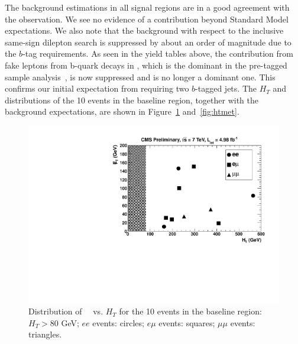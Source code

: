 \clearpage

The background estimations in all signal regions
are in a good agreement with the observation.  We see no evidence of 
a contribution beyond Standard Model expectations.
We also note that the background with respect to the inclusive same-sign
dilepton search is suppressed by about
an order of magnitude due to the $b$-tag requirements.
As seen in the yield tables above, the 
contribution from fake leptons from b-quark decays in \ttbar,
which is the dominant in the pre-tagged sample analysis~\cite{ssnote2011},
is now suppressed and is no longer a dominant one.
This confirms our initial expectation from requiring two $b$-tagged jets.
The $H_T$ and \met~ distributions of the 10 events 
in the baseline region,
together with the background expectations, are shown in 
Figure~\ref{fig:htvsmet} and~\ref{fig:htmet}.

\begin{figure}[h]
\begin{center}
\includegraphics[width=0.48\linewidth]{figs/MetVsHt.pdf}
\caption{\label{fig:htvsmet}
Distribution of \met~~vs. $H_T$ for the 10 events in the baseline region: $H_T > 80$ GeV; $ee$ events: circles; $e\mu$ events: squares; $\mu\mu$ events: triangles.}
\end{center}
\end{figure}

